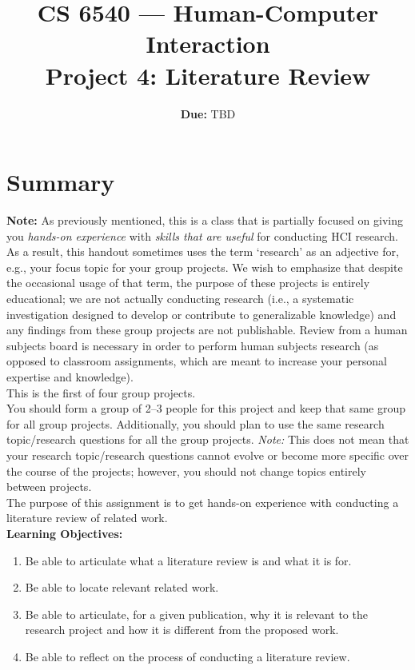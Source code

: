 \documentclass{article}
\title{CS 6540 --- Human-Computer Interaction\\\textbf{Project 4: Literature Review}}
\author{ }
\date{\textbf{Due:} TBD}
\begin{document}
\maketitle

\section{Summary}
\textbf{Note:} As previously mentioned, this is a class that is partially focused on giving you \textit{hands-on experience} with \textit{skills that are useful} for conducting HCI research. As a result, this handout sometimes uses the term `research' as an adjective for, e.g., your focus topic for your group projects. We wish to emphasize that despite the occasional usage of that term, the purpose of these projects is entirely educational; we are not actually conducting research (i.e., a systematic investigation designed to develop or contribute to generalizable knowledge) and any findings from these group projects are not publishable. Review from a human subjects board is necessary in order to perform human subjects research (as opposed to classroom assignments, which are meant to increase your personal expertise and knowledge).\\

This is the first of four group projects.\\

You should form a group of 2--3 people for this project and keep that same group for all group projects. Additionally, you should plan to use the same research topic/research questions for all the group projects. \textit{Note:} This does not mean that your research topic/research questions cannot evolve or become more specific over the course of the projects; however, you should not change topics entirely between projects.\\

The purpose of this assignment is to get hands-on experience with conducting a literature review of related work.\\

\textbf{Learning Objectives:}
\begin{enumerate}
    \item Be able to articulate what a literature review is and what it is for.
    \item Be able to locate relevant related work.
    \item Be able to articulate, for a given publication, why it is relevant to the research project and how it is different from the proposed work.
    \item Be able to reflect on the process of conducting a literature review.
\end{enumerate}\\
\end{document}

